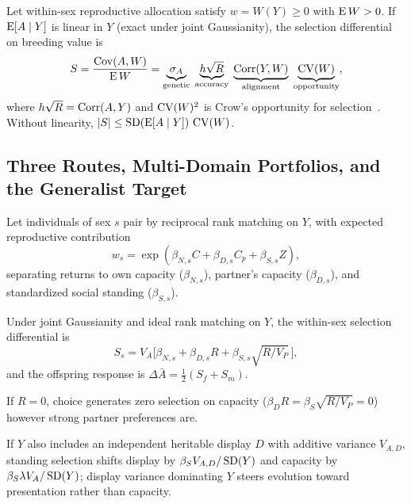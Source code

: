 \begin{proposition}\label{prop:identity}
Let within-sex reproductive allocation satisfy $w=W(Y)\ge0$ with $\operatorname{E} W>0$. If $\operatorname{E}[A\mid Y]$ is linear in $Y$ (exact under joint Gaussianity), the selection differential on breeding value is
\begin{equation}
S=\frac{\operatorname{Cov}(A,W)}{\operatorname{E} W}=\underbrace{\sigma_A}_{\text{genetic}}\;\underbrace{h\sqrt{R}}_{\text{accuracy}}\;\underbrace{\operatorname{Corr}(Y,W)}_{\text{alignment}}\;\underbrace{\operatorname{CV}(W)}_{\text{opportunity}},\label{eq:identity}
\end{equation}
where $h\sqrt{R}=\operatorname{Corr}(A,Y)$ and $\operatorname{CV}(W)^2$ is Crow's opportunity for selection~\cite{crow1958}. Without linearity, $|S|\le\operatorname{SD}(\operatorname{E}[A\mid Y])\,\operatorname{CV}(W)$.
\end{proposition}

\subsection{Three Routes, Multi-Domain Portfolios, and the Generalist Target}
Let individuals of sex $s$ pair by reciprocal rank matching on $Y$, with expected reproductive contribution
\begin{equation}
w_s=\exp(\beta_{N,s}C+\beta_{D,s}C_p+\beta_{S,s}Z),\label{eq:routes}
\end{equation}
separating returns to own capacity ($\beta_{N,s}$), partner's capacity ($\beta_{D,s}$), and standardized social standing ($\beta_{S,s}$).

\begin{proposition}\label{prop:routes}
Under joint Gaussianity and ideal rank matching on $Y$, the within-sex selection differential is
\begin{equation}
S_s=V_A\Big[\beta_{N,s}+\beta_{D,s}R+\beta_{S,s}\sqrt{R/V_P}\,\Big],\label{eq:threeroute}
\end{equation}
and the offspring response is $\Delta\bar A=\tfrac12(S_f+S_m)$.
\end{proposition}

\begin{corollary}\label{cor:bottleneck}
If $R=0$, choice generates zero selection on capacity ($\beta_D R=\beta_S\sqrt{R/V_P}=0$) however strong partner preferences are.
\end{corollary}

\begin{corollary}\label{cor:score}
If $Y$ also includes an independent heritable display $D$ with additive variance $V_{A,D}$, standing selection shifts display by $\beta_SV_{A,D}/\operatorname{SD}(Y)$ and capacity by $\beta_S\lambda V_A/\operatorname{SD}(Y)$; display variance dominating $Y$ steers evolution toward presentation rather than capacity.
\end{corollary}

